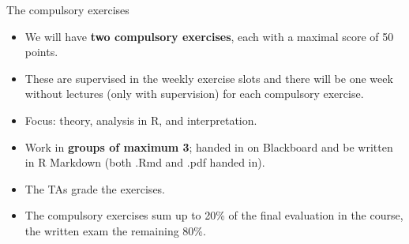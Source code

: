 \documentclass[10pt,ignorenonframetext,]{beamer}
\providecommand{\tightlist}{%
  \setlength{\itemsep}{0pt}\setlength{\parskip}{0pt}}
\begin{document}
\begin{frame}

\begin{block}{The compulsory exercises}

\vspace{4mm}

\begin{itemize}
\tightlist
\item
  We will have \textbf{two compulsory exercises}, each with a maximal
  score of 50 points.
\end{itemize}

\vspace{2mm}

\begin{itemize}
\tightlist
\item
  These are supervised in the weekly exercise slots and there will be
  one week without lectures (only with supervision) for each compulsory
  exercise.
\end{itemize}

\vspace{2mm}

\begin{itemize}
\tightlist
\item
  Focus: theory, analysis in R, and interpretation.
\end{itemize}

\vspace{2mm}

\begin{itemize}
\tightlist
\item
  Work in \textbf{groups of maximum 3}; handed in on Blackboard and be
  written in R Markdown (both .Rmd and .pdf handed in).
\end{itemize}

\vspace{2mm}

\begin{itemize}
\tightlist
\item
  The TAs grade the exercises.
\end{itemize}

\vspace{2mm}

\begin{itemize}
\tightlist
\item
  The compulsory exercises sum up to 20\% of the final evaluation in the
  course, the written exam the remaining 80\%.
\end{itemize}

\end{block}

\end{frame}
\end{document}
